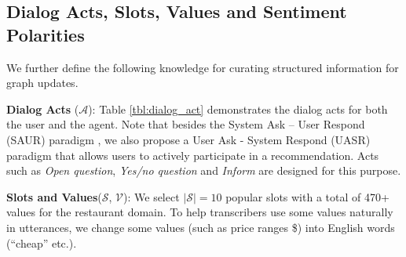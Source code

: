 \documentclass[11pt,a4paper]{article}
\begin{document}
\begin{table*}
    \centering
    \caption{\textbf{Statistics of the Dataset}: Dialogs w/ or w/o History indicates whether scenarios include visited items $\mathcal{H}$. }     
\label{tbl:dataset}
\end{table*}

\subsection{Dialog Acts, Slots, Values and Sentiment Polarities}
\label{sec:semantic}

We further define the following knowledge for curating structured information for graph updates.

\noindent \textbf{Dialog Acts} ($\mathcal{A}$): Table \ref{tbl:dialog_act} demonstrates the dialog acts for both the user and the agent.
Note that besides the System Ask – User Respond (SAUR) paradigm \cite{sun2018conversational,li2018towards,zhang2018towards}, we also propose a User Ask - System Respond (UASR) paradigm that allows users to actively participate in a recommendation. 
Acts such as \textit{Open question}, \textit{Yes/no question} and \textit{Inform} are designed for this purpose.

\noindent \textbf{Slots and Values}($\mathcal{S}$, $\mathcal{V}$): 
We select $\vert \mathcal{S} \vert = 10$ popular slots with a total of 470+ values for the restaurant domain.
To help transcribers use some values naturally in utterances, we change some values (such as price ranges \$) into English words (``cheap'' etc.).
\end{document}

